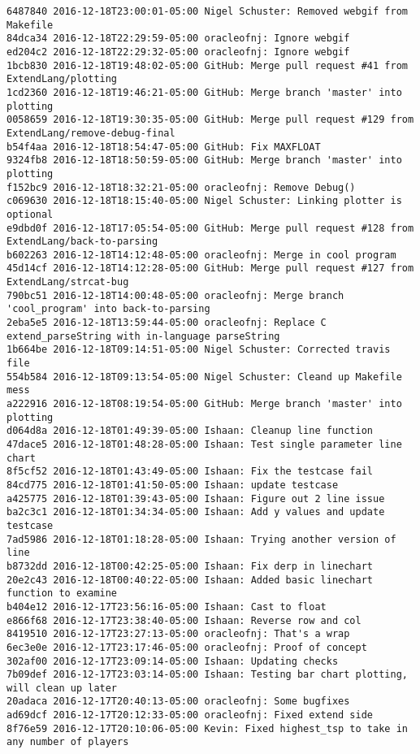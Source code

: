 \begin{lstlisting}
6487840 2016-12-18T23:00:01-05:00 Nigel Schuster: Removed webgif from Makefile
84dca34 2016-12-18T22:29:59-05:00 oracleofnj: Ignore webgif
ed204c2 2016-12-18T22:29:32-05:00 oracleofnj: Ignore webgif
1bcb830 2016-12-18T19:48:02-05:00 GitHub: Merge pull request #41 from ExtendLang/plotting
1cd2360 2016-12-18T19:46:21-05:00 GitHub: Merge branch 'master' into plotting
0058659 2016-12-18T19:30:35-05:00 GitHub: Merge pull request #129 from ExtendLang/remove-debug-final
b54f4aa 2016-12-18T18:54:47-05:00 GitHub: Fix MAXFLOAT
9324fb8 2016-12-18T18:50:59-05:00 GitHub: Merge branch 'master' into plotting
f152bc9 2016-12-18T18:32:21-05:00 oracleofnj: Remove Debug()
c069630 2016-12-18T18:15:40-05:00 Nigel Schuster: Linking plotter is optional
e9dbd0f 2016-12-18T17:05:54-05:00 GitHub: Merge pull request #128 from ExtendLang/back-to-parsing
b602263 2016-12-18T14:12:48-05:00 oracleofnj: Merge in cool program
45d14cf 2016-12-18T14:12:28-05:00 GitHub: Merge pull request #127 from ExtendLang/strcat-bug
790bc51 2016-12-18T14:00:48-05:00 oracleofnj: Merge branch 'cool_program' into back-to-parsing
2eba5e5 2016-12-18T13:59:44-05:00 oracleofnj: Replace C extend_parseString with in-language parseString
1b664be 2016-12-18T09:14:51-05:00 Nigel Schuster: Corrected travis file
554b584 2016-12-18T09:13:54-05:00 Nigel Schuster: Cleand up Makefile mess
a222916 2016-12-18T08:19:54-05:00 GitHub: Merge branch 'master' into plotting
d064d8a 2016-12-18T01:49:39-05:00 Ishaan: Cleanup line function
47dace5 2016-12-18T01:48:28-05:00 Ishaan: Test single parameter line chart
8f5cf52 2016-12-18T01:43:49-05:00 Ishaan: Fix the testcase fail
84cd775 2016-12-18T01:41:50-05:00 Ishaan: update testcase
a425775 2016-12-18T01:39:43-05:00 Ishaan: Figure out 2 line issue
ba2c3c1 2016-12-18T01:34:34-05:00 Ishaan: Add y values and update testcase
7ad5986 2016-12-18T01:18:28-05:00 Ishaan: Trying another version of line
b8732dd 2016-12-18T00:42:25-05:00 Ishaan: Fix derp in linechart
20e2c43 2016-12-18T00:40:22-05:00 Ishaan: Added basic linechart function to examine
b404e12 2016-12-17T23:56:16-05:00 Ishaan: Cast to float
e866f68 2016-12-17T23:38:40-05:00 Ishaan: Reverse row and col
8419510 2016-12-17T23:27:13-05:00 oracleofnj: That's a wrap
6ec3e0e 2016-12-17T23:17:46-05:00 oracleofnj: Proof of concept
302af00 2016-12-17T23:09:14-05:00 Ishaan: Updating checks
7b09def 2016-12-17T23:03:14-05:00 Ishaan: Testing bar chart plotting, will clean up later
20adaca 2016-12-17T20:40:13-05:00 oracleofnj: Some bugfixes
ad69dcf 2016-12-17T20:12:33-05:00 oracleofnj: Fixed extend side
8f76e59 2016-12-17T20:10:06-05:00 Kevin: Fixed highest_tsp to take in any number of players

\end{lstlisting}
